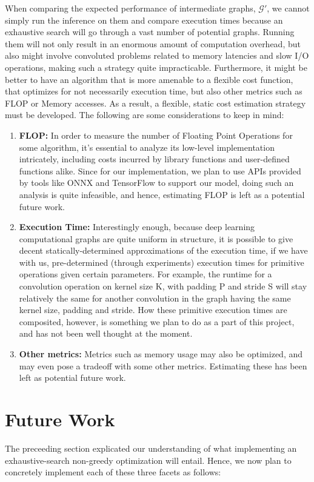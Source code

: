 \documentclass[12pt,a4paper,twoside,openright,bibliography=totocnumbered]{report}
\begin{document}
	When comparing the expected performance of intermediate graphs, $\mathcal{G'}$, we cannot simply run the inference on them and compare execution times because an exhaustive search will go through a vast number of potential graphs. Running them will not only result in an enormous amount of computation overhead, but also might involve convoluted problems related to memory latencies and slow I/O operations, making such a strategy quite impracticable. Furthermore, it might be better to have an algorithm that is more amenable to a flexible cost function, that optimizes for not necessarily execution time, but also other metrics such as FLOP or Memory accesses. As a result, a flexible, static cost estimation strategy must be developed. The following are some considerations to keep in mind:
	\begin{enumerate}
		\item \textbf{FLOP:} In order to measure the number of Floating Point Operations for some algorithm, it's essential to analyze its low-level implementation intricately, including costs incurred by library functions and user-defined functions alike. Since for our implementation, we plan to use APIs provided by tools like ONNX and TensorFlow to support our model, doing such an analysis is quite infeasible, and hence, estimating FLOP is left as a potential future work.
		\item \textbf{Execution Time:} Interestingly enough, because deep learning computational graphs are quite uniform in structure, it is possible to give decent statically-determined approximations of the execution time, if we have with us, pre-determined (through experiments) execution times for primitive operations given certain parameters. For example, the runtime for a convolution operation on kernel size K, with padding P and stride S will stay relatively the same for another convolution in the graph having the same kernel size, padding and stride. How these primitive execution times are composited, however, is something we plan to do as a part of this project, and has not been well thought at the moment.
		\item \textbf{Other metrics:} Metrics such as memory usage may also be optimized, and may even pose a tradeoff with some other metrics. Estimating these has been left as potential future work.
	\end{enumerate}

\chapter{Future Work}
The preceeding section explicated our understanding of what implementing an exhaustive-search non-greedy optimization will entail. Hence, we now plan to concretely implement each of these three facets as follows:
\end{document}
